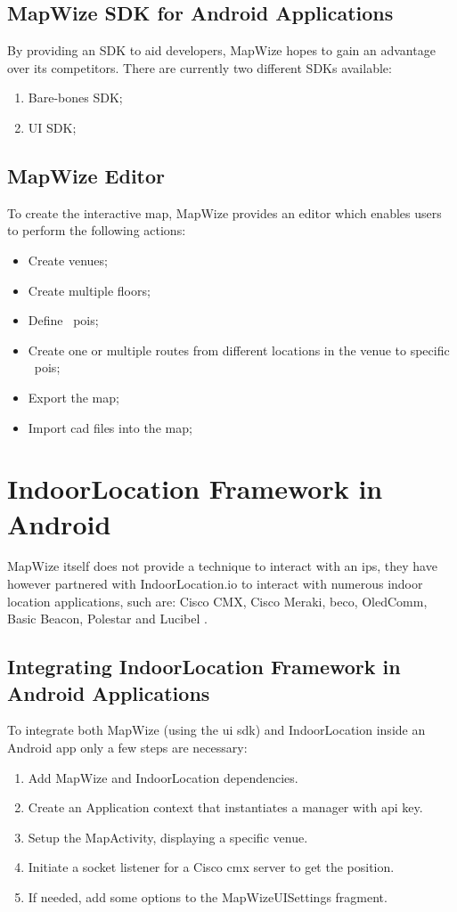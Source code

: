 \subsection{MapWize SDK for Android Applications}
By providing an SDK to aid developers, MapWize hopes to gain an advantage over its competitors. There are currently two different SDKs available:
\begin{enumerate}
\item Bare-bones SDK;
\item UI SDK;
\end{enumerate}
\subsection{MapWize Editor}
To create the interactive map, MapWize provides an editor which enables users to perform the following actions:
\begin{itemize}
\item Create venues;
\item Create multiple floors;
\item Define ~\acrshort{pois};
\item Create one or multiple routes from different locations in the venue to specific ~\acrlong{pois};
\item Export the map;
\item Import \acrshort{cad} files into the map;
\end{itemize}
\section{IndoorLocation Framework in Android}
MapWize itself does not provide a technique to interact with an \acrlong{ips}, they have however partnered with IndoorLocation.io to interact with numerous indoor location applications, such are: Cisco CMX, Cisco Meraki, beco, OledComm, Basic Beacon, Polestar and Lucibel \cite{IndoorLocation}.
\subsection{Integrating IndoorLocation Framework in Android Applications}
To integrate both MapWize (using the \acrshort{ui} \acrshort{sdk}) and IndoorLocation inside an Android \acrshort{app} only a few steps are necessary:
\begin{enumerate}
\item Add MapWize and IndoorLocation dependencies.
\item Create an Application context that instantiates a manager with \acrshort{api} key.
\item Setup the MapActivity, displaying a specific venue.
\item Initiate a socket listener for a Cisco \acrshort{cmx} server to get the position.
\item If needed, add some options to the MapWizeUISettings fragment.
\end{enumerate}
